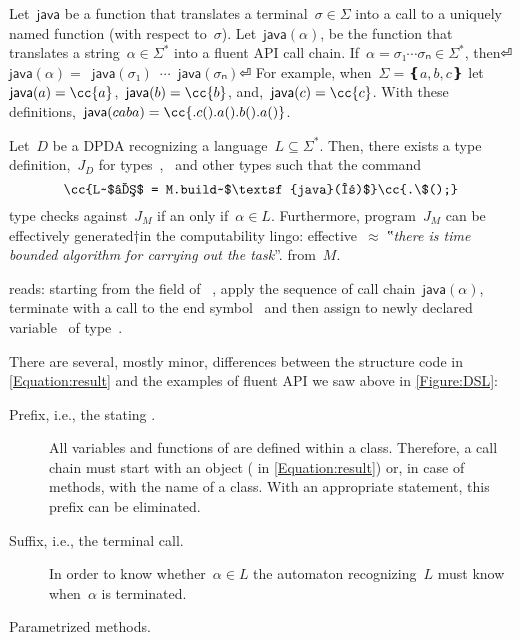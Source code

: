 Let~$\textsf{java}$ be a function that translates a terminal~$σ∈Σ$
into a call to a uniquely named function (with respect to~$σ$).
Let~$\textsf{java}(α)$, be the function
  that translates a string~$α∈Σ^*$ into a fluent API call chain.
If~$α=σ₁⋯σₙ∈Σ^*$, then⏎
  \mbox{\qquad\qquad}$\textsf{java}(α)=$~$\textsf{java}(σ₁)$~$⋯$~$\textsf{java}(σₙ)$\cc{()}⏎
For example, when~$Σ=❴a,b,c❵$ let~$\textsf{java}(a)=\cc{a}$,~$\textsf{java}(b)=\cc{b}$, and,~$\textsf{java}(c)=\cc{c}$.
With these definitions,~$\textsf{java}(caba) = \cc{.c().a().b().a()}$.

\begin{theorem}\label{Theorem:Gil-Levy}
  Let~$D$ be a DPDA recognizing a language~$L⊆Σ^*$.
  Then, there exists a \Java type definition,~$J_D$ for types~,~ and 
    other types such that the \Java command
  \begin{equation}
    \label{Equation:result}
    \cc{L~$ℓ$ = M.build~$\textsf{java}(α)$}\cc{.\$();}
  \end{equation}
  type checks against~$J_M$ if an only if~$α∈L$.
  Furthermore, program~$J_M$ can be effectively generated†{in the computability lingo:
    effective~$≈$ ‟\emph{there is time
  bounded algorithm for carrying out the task}”.} from~$M$.
\end{theorem}

 reads: starting from the  field  of ~,
  apply the sequence of call chain~$\textsf{java}(α)$, terminate with a call to the
  end symbol~\cc{\$()} and then assign to newly declared variable~ of type~.

There are several, mostly minor, differences between the structure \Java code in \cref{Equation:result}
  and the examples of fluent API we saw above in \cref{Figure:DSL}:
\begin{description}
  \item[Prefix, i.e., the stating .]
    All variables and functions of \Java are defined within a class.
    Therefore, a call chain must start with an object ( in \cref{Equation:result})
      or, in case of  methods, with the name of a class.
    With an appropriate  statement, this prefix can be eliminated.
  \item[Suffix, i.e., the terminal  call.]
    In order to know whether~$α∈L$ the automaton recognizing~$L$ must
      know when~$α$ is terminated.
  \item[Parametrized methods.]
\end{description}
